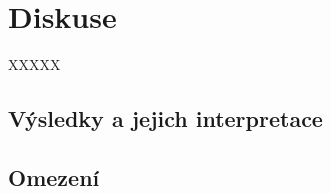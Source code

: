 \chapter{Diskuse}

%
%
%
%
%

XXXXX


\section{Výsledky a jejich interpretace}

\section{Omezení}


